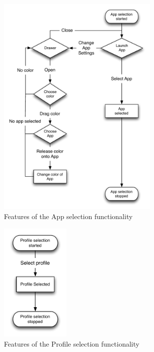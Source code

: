 \begin{figure}[h]
	\centering
	\includegraphics[width=0.7\textwidth]{gfx/appselection.pdf}
	\caption{Features of the App selection functionality}
	\label{fig:appselection_design}
\end{figure}

\begin{figure}[h]
	\centering
	\includegraphics[width=0.3\textwidth]{gfx/profileselect_design.pdf}
	\caption{Features of the Profile selection functionality}
	\label{fig:profileselection_design}
\end{figure}

